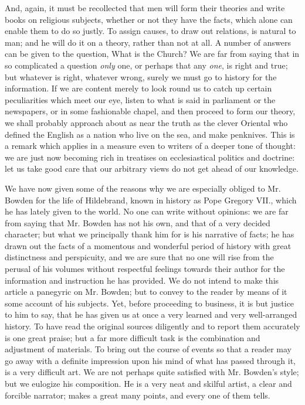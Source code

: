 And, again, it must be recollected that men will
form their theories and write books on religious subjects, whether or
not they have the facts, which alone can enable them to do so justly.
To assign causes, to draw out relations, is natural to man; and he
will do it on a theory, rather than not at all. A number of answers
can be given to the question, What is the Church? We are far from
saying that in so complicated a question \emph{only} one, or perhaps
that any \emph{one}, is right and true; but whatever is right,
whatever wrong, surely we must go to history for the information. If
we are content merely to look round us to catch up certain
peculiarities which meet our eye, listen to what is said in parliament
or the newspapers, or in some fashionable chapel, and then proceed to
form our theory, we shall probably approach about as near the truth as
the clever Oriental who defined the English as a nation who live on
the sea, and make penknives. This is a remark which applies in a
measure even to writers of a deeper tone of thought: we are just now
becoming rich in treatises on ecclesiastical politics and doctrine:
let us take good care that our arbitrary views do not get ahead of our
knowledge.

We have now given some of the reasons why we are
especially obliged to Mr. Bowden for the life of Hildebrand, known in history as Pope Gregory VII., which he has lately given to
the world. No one can write without opinions: we are far from saying
that Mr. Bowden has not his own, and that of a very decided character;
but what we principally thank him for is his narrative of facts; he
has drawn out the facts of a momentous and wonderful period of history
with great distinctness and perspicuity, and we are sure that no one
will rise from the perusal of his volumes without respectful feelings
towards their author for the information and instruction he has
provided. We do not intend to make this article a panegyric on Mr.
Bowden; but to convey to the reader by means of it some account of his
subjects. Yet, before proceeding to business, it is but justice to him
to say, that he has given us at once a very learned and very
well-arranged history. To have read the original sources diligently
and to report them accurately is one great praise; but a far more
difficult task is the combination and adjustment of materials. To
bring out the course of events so that a reader may go away with a
definite impression upon his mind of what has passed through it, is a
very difficult art. We are not perhaps quite satisfied with Mr. Bowden's
style; but we eulogize his composition. He is a very neat and skilful
artist, a clear and forcible narrator; makes a great many points, and
every one of them tells.

